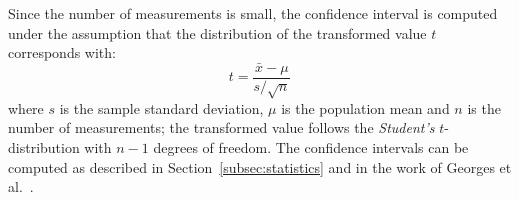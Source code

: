 Since the number of measurements is small, the confidence interval is computed under the assumption that the distribution of the transformed value \(t\) corresponds with:
\begin{equation*}
  t = \frac{\bar{x} - \mu}{s/\sqrt{n}}
\end{equation*}
where \(s\) is the sample standard deviation, \(\mu\) is the population mean and \(n\) is the number of measurements; the transformed value follows the \textit{Student's} \(t\)-distribution with \(n - 1\) degrees of freedom. The confidence intervals can be computed as described in Section~\ref{subsec:statistics} and in the work of Georges et al.~\cite{DBLP_conf_oopsla_GeorgesBE07}.
